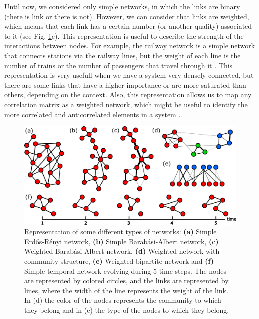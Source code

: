 Until now, we considered only simple networks, in which the links are binary (there is link or there is not). However, we can consider that links are weighted, which means that each link has a certain number (or another quality) associated to it \cite{barrat2004architecture} (see Fig. \ref{fig:netwotk_types}c). This representation is useful to describe the strength of the interactions between nodes. For example, the railway network is a simple network that connects stations via the railway lines, but the weight of each line is the number of trains or the number of passengers that travel through it \cite{latora-2002}. This representation is very usefull when we have a system very densely connected, but there are some links that have a higher importance or are more saturated than others, depending on the context. Also, this representation allows us to map any correlation matrix as a weighted network, which might be useful to identify the more correlated and anticorrelated elements in a system \cite{onnela-2003,tumminello-2005}.

\begin{figure}
    \centering
    \includegraphics[width=\textwidth]{Figs/Introduction/network_plot.pdf}
    \caption[Different network types]{Representation of some different types of networks: \textbf{(a)} Simple Erd\H{o}s-R\'enyi network, \textbf{(b)} Simple Barab\'asi-Albert network, \textbf{(c)} Weighted Barab\'asi-Albert network, \textbf{(d)} Weighted network with community structure, \textbf{(e)} Weighted bipartite network and \textbf{(f)} Simple temporal network evolving during 5 time steps. The nodes are represented by colored circles, and the links are represented by lines, where the width of the line represents the weight of the link. In (d) the color of the nodes represents the community to which they belong and in (e) the type of the nodes to which they belong.}
    \label{fig:netwotk_types}
\end{figure}


